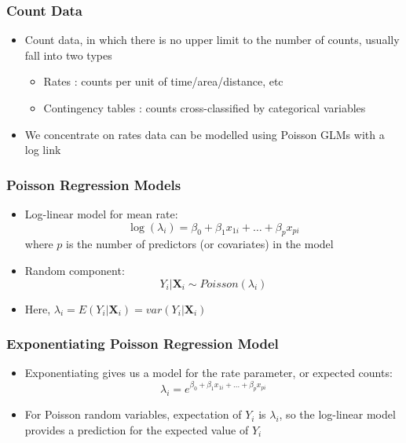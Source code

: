 \documentclass[10pt,xcolor={svgnames},t]{beamer}
\begin{document}
%
\begin{frame}
	\frametitle{Count Data}
	
	\begin{itemize}
		\item Count data, in which there is no upper limit to the number of counts, usually fall into two types
				\bigskip
		\begin{itemize}
			\item Rates : counts per unit of time/area/distance, etc
			\item Contingency tables : counts cross-classified by categorical variables
		\end{itemize}
		\bigskip
		\item We concentrate on rates data can be modelled using Poisson GLMs with a log link
	\end{itemize}
	
	
 \end{frame}
%
%
\begin{frame}
	\frametitle{Poisson Regression Models}
	
	\begin{itemize}
		\item Log-linear model for mean rate:
		\[ \log(\lambda_i ) = \beta_0 + \beta_1 x_{1i} + \ldots +\beta_p x_{pi}
		\]
		where $p$ is the number of predictors (or covariates) in the model
		\bigskip
		\item Random component:
		\[ Y_i|\mathbf{X}_i \sim Poisson(\lambda_i )
		\]
		\smallskip
		\item Here, $\lambda_i = E(Y_i|\mathbf{X}_i)=var(Y_i|\mathbf{X}_i)$
	\end{itemize}
	
	\end{frame}
%
%
\begin{frame}
	\frametitle{Exponentiating Poisson Regression Model}
	
	\begin{itemize}
		\item Exponentiating gives us a model for the rate parameter, or expected counts:
		\[ \lambda_i  = e^{\beta_0 + \beta_1 x_{1i} + \ldots +\beta_p x_{pi}}
		\]
				\bigskip
		\item For Poisson random variables, expectation of $Y_i$ is $\lambda_i$, so the log-linear model provides a prediction for the expected value of $Y_i$
	\end{itemize}
	
	
\end{frame}
\end{document}
